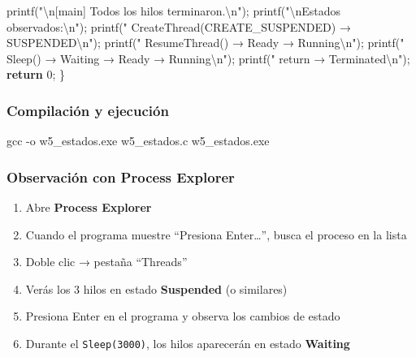 \documentclass[
  spanish,
]{article}
\newenvironment{Shaded}{}{}
\newcommand{\AttributeTok}[1]{\textcolor[rgb]{0.49,0.56,0.16}{#1}}
\newcommand{\ControlFlowTok}[1]{\textcolor[rgb]{0.00,0.44,0.13}{\textbf{#1}}}
\newcommand{\DecValTok}[1]{\textcolor[rgb]{0.25,0.63,0.44}{#1}}
\newcommand{\NormalTok}[1]{#1}
\newcommand{\OperatorTok}[1]{\textcolor[rgb]{0.40,0.40,0.40}{#1}}
\newcommand{\SpecialCharTok}[1]{\textcolor[rgb]{0.25,0.44,0.63}{#1}}
\newcommand{\StringTok}[1]{\textcolor[rgb]{0.25,0.44,0.63}{#1}}
\providecommand{\tightlist}{%
  \setlength{\itemsep}{0pt}\setlength{\parskip}{0pt}}
\begin{document}
\begin{Shaded}
\begin{Highlighting}[]
\NormalTok{    printf}\OperatorTok{(}\StringTok{"}\SpecialCharTok{\textbackslash{}n}\StringTok{[main] Todos los hilos terminaron.}\SpecialCharTok{\textbackslash{}n}\StringTok{"}\OperatorTok{);}
\NormalTok{    printf}\OperatorTok{(}\StringTok{"}\SpecialCharTok{\textbackslash{}n}\StringTok{Estados observados:}\SpecialCharTok{\textbackslash{}n}\StringTok{"}\OperatorTok{);}
\NormalTok{    printf}\OperatorTok{(}\StringTok{"  CreateThread(CREATE\_SUSPENDED) → SUSPENDED}\SpecialCharTok{\textbackslash{}n}\StringTok{"}\OperatorTok{);}
\NormalTok{    printf}\OperatorTok{(}\StringTok{"  ResumeThread() → Ready → Running}\SpecialCharTok{\textbackslash{}n}\StringTok{"}\OperatorTok{);}
\NormalTok{    printf}\OperatorTok{(}\StringTok{"  Sleep()       → Waiting → Ready → Running}\SpecialCharTok{\textbackslash{}n}\StringTok{"}\OperatorTok{);}
\NormalTok{    printf}\OperatorTok{(}\StringTok{"  return        → Terminated}\SpecialCharTok{\textbackslash{}n}\StringTok{"}\OperatorTok{);}
    \ControlFlowTok{return} \DecValTok{0}\OperatorTok{;}
\OperatorTok{\}}
\end{Highlighting}
\end{Shaded}

\subsubsection{Compilación y
ejecución}\label{compilaciuxf3n-y-ejecuciuxf3n-4}

\begin{Shaded}
\begin{Highlighting}[]
\NormalTok{gcc }\AttributeTok{{-}o}\NormalTok{ w5\_estados.exe w5\_estados.c}
\NormalTok{w5\_estados.exe}
\end{Highlighting}
\end{Shaded}

\subsubsection{Observación con Process
Explorer}\label{observaciuxf3n-con-process-explorer}

\begin{enumerate}
\def\labelenumi{\arabic{enumi}.}
\tightlist
\item
  Abre \textbf{Process Explorer}
\item
  Cuando el programa muestre ``Presiona Enter\ldots{}'', busca el
  proceso en la lista
\item
  Doble clic → pestaña ``Threads''
\item
  Verás los 3 hilos en estado \textbf{Suspended} (o similares)
\item
  Presiona Enter en el programa y observa los cambios de estado
\item
  Durante el \texttt{Sleep(3000)}, los hilos aparecerán en estado
  \textbf{Waiting}
\end{enumerate}
\end{document}
